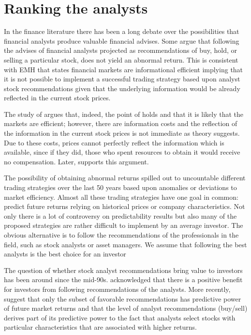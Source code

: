 \documentclass{article}\usepackage[]{graphicx}\usepackage[]{color}
\begin{document}
\section{Ranking the analysts}
\label{sec:ranking}

In the finance literature there has been a long debate over the possibilities that financial analysts produce valuable financial advises. Some argue that following the advises of financial analysts projected as recommendations of buy, hold, or selling a particular stock, does not yield an abnormal return. This is consistent with EMH that states financial markets are informational efficient implying that it is not possible to implement a successful trading strategy based upon analyst stock recommendations given that the underlying information would be already reflected in the current stock prices.

The study of \cite{grossman1980iie} argues that, indeed, the point of \cite{fama1970ecm} holds and that it is likely that the markets are efficient; however, there are  information costs and the reflection of the information in the current stock prices is  not immediate as theory suggests. Due to these costs, prices cannot perfectly reflect the information which is available, since if they did, those who spent resources to obtain it would receive no compensation. Later, \cite{fama1991ecm} supports this argument.

The possibility of obtaining abnormal returns spilled out to uncountable different trading strategies over the last 50 years based upon anomalies or deviations to market efficiency. Almost all these trading strategies have one goal in common: predict future returns relying on historical prices or company characteristics. Not only there is a lot of controversy on predictability results but also many of the proposed strategies are rather difficult to implement by an average investor. The obvious alternative is to follow the recommendations of the professionals in the field, such as stock analysts or asset managers. We assume that following the best analysts is the best choice for an investor

The question of whether stock analyst recommendations bring value to investors has been around since the mid-90s. \cite{womack1996} acknowledged that there is a positive benefit for investors from following recommendations of the analysts.
More recently, \cite{jegadeesh2004} suggest that only the subset of favorable recommendations has predictive power of future market returns and that the level of analyst recommendations (buy/sell) derives part of its predictive power to the fact that analysts select stocks with particular characteristics that are associated with higher returns.
\end{document}
